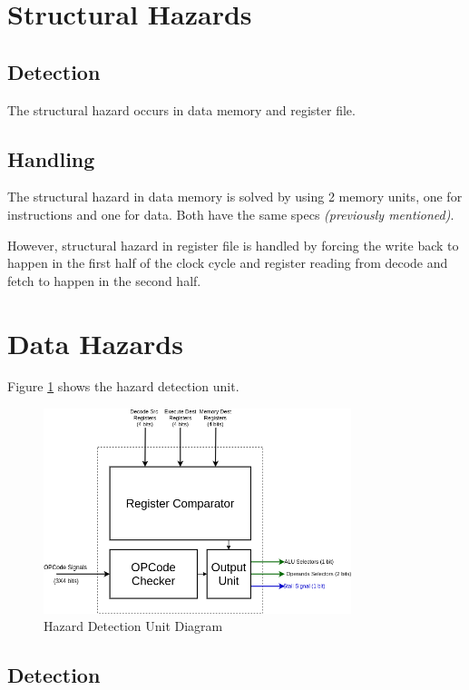 \section{Structural Hazards}

\subsection{Detection}
The structural hazard occurs in data memory and register file.

\subsection{Handling}
The structural hazard in data memory is solved by using 2 memory units, one for instructions and one for data. Both have the same specs \emph{(previously mentioned)}.

However, structural hazard in register file is handled by forcing the write back to happen in the first half of the clock cycle and register reading from decode and fetch to happen in the second half.

\section{Data Hazards}

Figure \ref{fig:hdu} shows the hazard detection unit.
\begin{figure}[hp]
    \centering
    \includegraphics[width=0.8\textwidth]{images/hdu}
    \caption{Hazard Detection Unit Diagram}
    \label{fig:hdu}
\end{figure}

\subsection{Detection}

